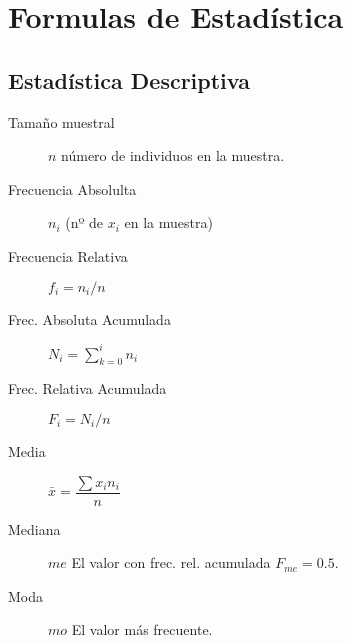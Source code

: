 
\sloppy

\section*{Formulas de Estadística}

\footnotesize
{}

\begin{multicols*}{2}

	\subsection*{Estadística Descriptiva}

	\begin{tcolorbox}[hbox, title=Frecuencias]
		\begin{minipage}{0.4\textwidth}
			\begin{description}
				\item [Tamaño muestral] $n$ número de individuos en la muestra.
			\end{description}
			\begin{description}
				\item [Frecuencia Absolulta] $n_i$ (nº de $x_i$ en la muestra)
				\item [Frecuencia Relativa] $f_i=n_i/n$
				\item [Frec. Absoluta Acumulada] $N_i=\sum_{k=0}^in_i$
				\item [Frec. Relativa Acumulada] $F_i=N_i/n$
			\end{description}
		\end{minipage}
	\end{tcolorbox}

	\begin{tcolorbox}[hbox, title=Estadísticos de tendencia central]
		\begin{minipage}{0.4\textwidth}
			\begin{description}
				\item [Media] $\bar{x}=\dfrac{\sum x_in_i}{n}$
				\item [Mediana] $me$ El valor con frec. rel. acumulada $F_{me}=0.5$.
				\item [Moda] $mo$ El valor más frecuente.
			\end{description}
		\end{minipage}
	\end{tcolorbox}


\end{multicols*}
